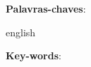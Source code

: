 \begin{epigrafe}
    \vspace*{\fill}
	\begin{flushright}
        \EpigrafeTexto
	\end{flushright}
\end{epigrafe}


\setlength{\absparsep}{18pt} %
\begin{resumo}
    \ResumoTexto
    \vspace{\onelineskip}
    \noindent 
    \textbf{Palavras-chaves}: \PalavraschaveTexto
\end{resumo}

\begin{resumo}[ABSTRACT]
 \begin{otherlanguage*}{english}
   \AbstractTexto
   \vspace{\onelineskip}
 
   \noindent 
   \textbf{Key-words}: \KeywordsTexto
 \end{otherlanguage*}
\end{resumo}

%  
% 
%   

\listoffigures*
\cleardoublepage

\listoftables*

\listarsiglas

\listarsimbolos

\tableofcontents*
\cleardoublepage

